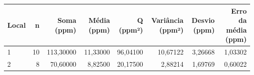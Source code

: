 \begin{tabular}{lrrrrrrr}
\toprule
Local & n & Soma (ppm) & Média (ppm) & Q (ppm²) & Variância (ppm²) & Desvio (ppm) & Erro da média (ppm) \\
\midrule
1 & 10 & 113,30000 & 11,33000 & 96,04100 & 10,67122 & 3,26668 & 1,03302 \\
2 & 8 & 70,60000 & 8,82500 & 20,17500 & 2,88214 & 1,69769 & 0,60022 \\
\bottomrule
\end{tabular}
